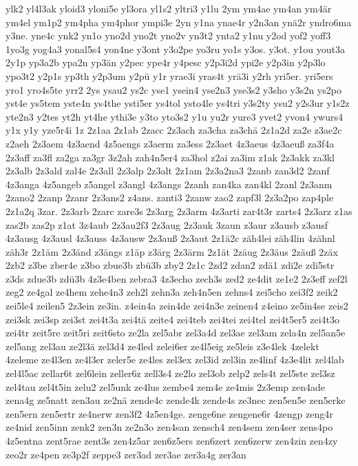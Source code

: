 {ylk2
yl4l3ak
yloid3
yloni5e
yl3ora
yl1s2
yltri3
y1lu
2ym
ym4ae
ym4an
ym4är
ym4el
ym1p2
ym4pha
ym4phor
ympi3e
2yn
y1na
ynae4r
y2n3an
ynä2r
yndro6ma
y3ne.
yne4c
ynk2
yn1o
yno2d
yno2t
yno2v
yn3t2
ynta2
y1nu
y2od
yof2
yoff3
1yo3g
yog4a3
yonal5s4
yon4ne
y3ont
y3o2pe
yo3ru
yo1s
y3os.
y3ot.
y1ou
yout3a
2y1p
yp3a2b
ypa2n
yp3än
y2pec
ype4r
y4pesc
y2p3i2d
ypi2e
y2p3in
y2p3lo
ypo3t2
y2p1s
yp3th
y2p3um
y2pü
y1r
yrae3i
yras4t
yrä3i
y2rh
yri5er.
yri5ers
yro1
yro4s5te
yrr2
2ys
ysau2
ys2c
yse1
ysein4
yse2n3
yse3s2
y3sho
y3s2n
ys2po
yst4e
ys5tem
yste4n
ys4the
ysti5er
ys4tol
ysto4le
ys4tri
y3s2ty
ysu2
y2s3ur
y1s2z
yte2n3
y2tes
yt2h
yt4he
ythi3e
y3to
yto3s2
y1u
yu2r
yure3
yvet2
yvon4
ywurs4
y1x
y1y
yze5r4i
1z
2z1aa
2z1ab
2zacc
2z3ach
za3cha
za3chä
2z1a2d
za2e
z3ae2c
z2aeh
2z3aem
4z3aend
4z5aengs
z3aerm
za3ess
2z3aet
4z3aeus
4z3aeuß
za3f4a
2z3aff
za3fl
za2ga
za3gr
3z2ah
zah4n5er4
za3hol
z2ai
za3im
z1ak
2z3akk
za3kl
2z3alb
2z3ald
zal4e
2z3all
2z3alp
2z3alt
2z1am
2z3a2na3
2zanb
zan3d2
2zanf
4z3anga
4z5angeb
z5angel
z3angl
4z3angs
2zanh
zan4ka
zan4kl
2zanl
2z3anm
2zano2
2zanp
2zanr
2z3ans2
z4ans.
zanti3
2zanw
zao2
zapf3l
2z3a2po
zap4ple
2z1a2q
3zar.
2z3arb
2zarc
zare3s
2z3arg
2z3arm
4z3arti
zar4t3r
zarts4
2z3arz
z1as
zas2b
zas2p
z1at
3z4aub
2z3au2f3
2z3aug
2z3auk
3zaun
z3aur
z3ausb
z3ausf
4z3ausg
4z3ausl
4z3auss
4z3ausw
2z3auß
2z3aut
2z1ä2c
zäh4lei
zäh4lin
4zähnl
zäh3r
2z1äm
2z3änd
z3ängs
z1äp
z3ärg
2z3ärm
2z1ät
2zäug
2z3äus
2zäuß
2zäx
2zb2
z3be
zber4e
z3bo
zbue3b
zbü3b
zby2
2z1c
2zd2
zdan2
zdä1
zdi2e
zdi5str
z3ds
zdue3b
zdü3b
4z3e4ben
zebra3
4z3echo
zech3s
zed2
ze4dit
ze1e2
2z3eff
zef2l
zeg2
ze4gal
ze4hem
zehe4n3
zeh2l
zehn3a
zeh4n5en
zehns4
zei5cho
zei3f2
zeik2
zei5le4
zeilen5
2z3ein
ze3in.
z4ein4a
zein4de
zei4n3e
zeinen4
z4eino
ze5in4se
zeis2
zei3sk
zei3sp
zei3st
zei4t3a
zei4tä
zeite4
zei4teb
zei4tei
zei4tel
zei4t5er5
zei4t3o
zei4tr
zeit5re
zeit5ri
zeit6sto
ze2la
zel5abr
zel3a4d
zel3ae
zel3am
zela4n
zel5an5e
zel5ang
zel3au
ze2l3ä
zel3d4
ze4led
zelei6er
ze4l5eig
ze5leis
z3e4lek
4zelekt
4zeleme
ze4l3en
ze4l3er
zeler5e
ze4les
zel3ex
zel3id
zel3in
ze4linf
4z3e4lit
zel4lab
zel4l5ac
zellar6t
zel6lein
zeller6z
zell3s4
ze2lo
zel3ob
zelp2
zels4t
zel5ste
zel3sz
zel4tau
zel4t5in
zelu2
zel5unk
ze4lus
zembe4
zem4e
ze4mis
2z3emp
zen4ade
zena4g
ze5natt
zen3au
ze2nä
zende4c
zende4k
zende4s
ze3nec
zen5en5e
zen5erke
zen5ern
zen5ertr
ze4nerw
zen3f2
4z5en4ge.
zenge6ne
zengene6r
4zengp
zeng4r
ze4nid
zen5inn
zenk2
zen3n
ze2n3o
zen4san
zensch4
zen4sem
zen4ser
zens4po
4z5entna
zent5rae
zent3s
zen4z5ar
zen6z5ers
zen6zert
zen6zerw
zen4zin
zen4zy
zeo2r
ze4pen
ze3p2f
zeppe3
zer3ad
zer3ae
zer3a4g
zer3an
}
